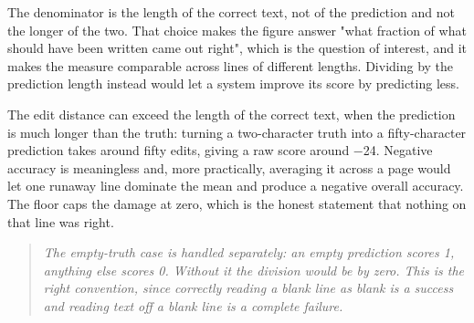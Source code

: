 The denominator is the length of the correct text, not of the prediction and not the longer of the two. That choice makes the figure answer "what fraction of what should have been written came out right", which is the question of interest, and it makes the measure comparable across lines of different lengths. Dividing by the prediction length instead would let a system improve its score by predicting less.


The edit distance can exceed the length of the correct text, when the prediction is much longer than the truth: turning a two-character truth into a fifty-character prediction takes around fifty edits, giving a raw score around $-$24. Negative accuracy is meaningless and, more practically, averaging it across a page would let one runaway line dominate the mean and produce a negative overall accuracy. The floor caps the damage at zero, which is the honest statement that nothing on that line was right.


\begin{quote}\small\itshape The empty-truth case is handled separately: an empty prediction scores 1, anything else scores 0. Without it the division would be by zero. This is the right convention, since correctly reading a blank line as blank is a success and reading text off a blank line is a complete failure.\end{quote}

